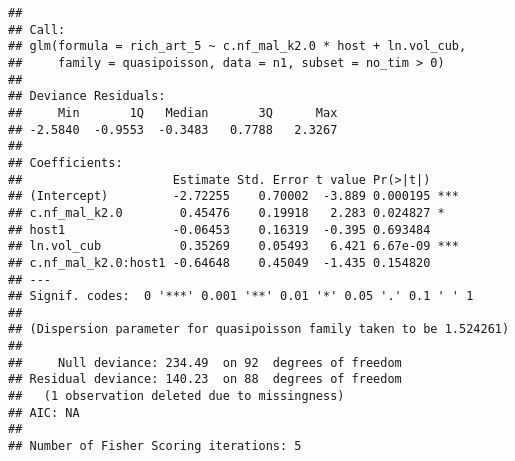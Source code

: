 \documentclass[]{article}
\newenvironment{Shaded}{\begin{snugshade}}{\end{snugshade}}
\newcommand{\KeywordTok}[1]{\textcolor[rgb]{0.13,0.29,0.53}{\textbf{#1}}}
\newcommand{\DataTypeTok}[1]{\textcolor[rgb]{0.13,0.29,0.53}{#1}}
\newcommand{\DecValTok}[1]{\textcolor[rgb]{0.00,0.00,0.81}{#1}}
\newcommand{\FloatTok}[1]{\textcolor[rgb]{0.00,0.00,0.81}{#1}}
\newcommand{\StringTok}[1]{\textcolor[rgb]{0.31,0.60,0.02}{#1}}
\newcommand{\CommentTok}[1]{\textcolor[rgb]{0.56,0.35,0.01}{\textit{#1}}}
\newcommand{\OperatorTok}[1]{\textcolor[rgb]{0.81,0.36,0.00}{\textbf{#1}}}
\newcommand{\NormalTok}[1]{#1}
\begin{document}
\begin{Shaded}
\end{Shaded}

\begin{verbatim}
## 
## Call:
## glm(formula = rich_art_5 ~ c.nf_mal_k2.0 * host + ln.vol_cub, 
##     family = quasipoisson, data = n1, subset = no_tim > 0)
## 
## Deviance Residuals: 
##     Min       1Q   Median       3Q      Max  
## -2.5840  -0.9553  -0.3483   0.7788   2.3267  
## 
## Coefficients:
##                     Estimate Std. Error t value Pr(>|t|)    
## (Intercept)         -2.72255    0.70002  -3.889 0.000195 ***
## c.nf_mal_k2.0        0.45476    0.19918   2.283 0.024827 *  
## host1               -0.06453    0.16319  -0.395 0.693484    
## ln.vol_cub           0.35269    0.05493   6.421 6.67e-09 ***
## c.nf_mal_k2.0:host1 -0.64648    0.45049  -1.435 0.154820    
## ---
## Signif. codes:  0 '***' 0.001 '**' 0.01 '*' 0.05 '.' 0.1 ' ' 1
## 
## (Dispersion parameter for quasipoisson family taken to be 1.524261)
## 
##     Null deviance: 234.49  on 92  degrees of freedom
## Residual deviance: 140.23  on 88  degrees of freedom
##   (1 observation deleted due to missingness)
## AIC: NA
## 
## Number of Fisher Scoring iterations: 5
\end{verbatim}
\end{document}

